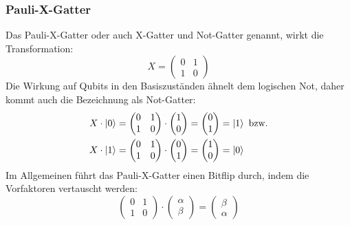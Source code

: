 \subsubsection*{Pauli-X-Gatter}
Das Pauli-X-Gatter oder auch X-Gatter und Not-Gatter genannt, 
wirkt die Transformation: 
\[
  X = 
  \begin{pmatrix}
    0 & 1 \\
    1 & 0
    \end{pmatrix}
  \]
Die Wirkung auf Qubits in den Basiszuständen ähnelt dem logischen Not, 
daher kommt auch die Bezeichnung als Not-Gatter:
\begin{align*}
  &X \cdot
  \ket{0} 
  =
  \begin{pmatrix}
    0 & 1 \\
    1 & 0
    \end{pmatrix}
    \cdot
    \begin{pmatrix}
      1 \\
      0
    \end{pmatrix}
    = 
    \begin{pmatrix}
      0 \\
      1
    \end{pmatrix}
    = 
    \ket{1}
    \text{ bzw.} \\
    &X \cdot
  \ket{1} 
  =
  \begin{pmatrix}
    0 & 1 \\
    1 & 0
    \end{pmatrix}
    \cdot
    \begin{pmatrix}
      0 \\
      1
    \end{pmatrix}
    = 
    \begin{pmatrix}
      1 \\
      0
    \end{pmatrix}
    = 
    \ket{0}
  \end{align*}
Im Allgemeinen führt das Pauli-X-Gatter einen Bitflip durch, 
indem die Vorfaktoren vertauscht werden:
\[
  \begin{pmatrix}
    0 & 1 \\
    1 & 0
    \end{pmatrix}
    \cdot
    \begin{pmatrix}
      \alpha \\
      \beta
    \end{pmatrix}
    =
    \begin{pmatrix}
      \beta \\
      \alpha
    \end{pmatrix}
  \]


